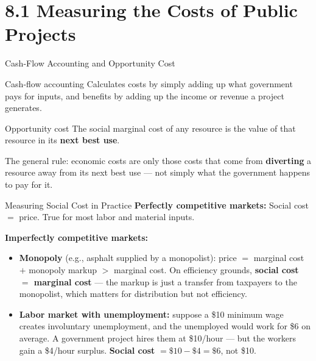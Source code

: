 \documentclass[11pt,aspectratio=169]{beamer}
\begin{document}
\section{8.1 Measuring the Costs of Public Projects}

\begin{frame}{Cash-Flow Accounting and Opportunity Cost}
  \begin{block}{Cash-flow accounting}
    Calculates costs by simply adding up what government pays for inputs, and benefits by adding up the income or revenue a project generates.
  \end{block}
  \begin{block}{Opportunity cost}
    The social marginal cost of any resource is the value of that resource in its \textbf{next best use}.
  \end{block}
  \vspace{0.4em}
  \small The general rule: economic costs are only those costs that come from \textbf{diverting} a resource away from its next best use --- not simply what the government happens to pay for it.
\end{frame}

\begin{frame}{Measuring Social Cost in Practice}
  \textbf{Perfectly competitive markets:} Social cost $=$ price. True for most labor and material inputs.
  \vspace{0.5em}

  \textbf{Imperfectly competitive markets:}
  \begin{itemize}
    \item \textbf{Monopoly} (e.g., asphalt supplied by a monopolist): price $=$ marginal cost $+$ monopoly markup $>$ marginal cost. On efficiency grounds, \textbf{social cost $=$ marginal cost} --- the markup is just a transfer from taxpayers to the monopolist, which matters for distribution but not efficiency.
    \item \textbf{Labor market with unemployment:} suppose a \$10 minimum wage creates involuntary unemployment, and the unemployed would work for \$6 on average. A government project hires them at \$10/hour --- but the workers gain a \$4/hour surplus. \textbf{Social cost} $= \$10 - \$4 = \$6$, not \$10.
  \end{itemize}
\end{frame}
\end{document}
